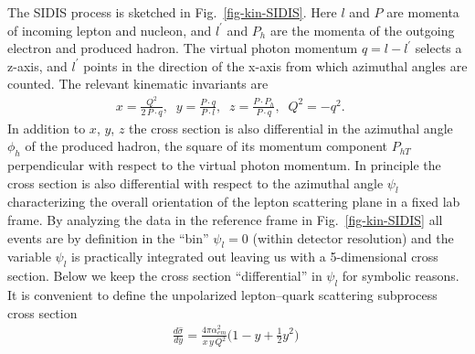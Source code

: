 \documentclass[a4paper,11pt]{article}
\newcommand{\blue}[1]{{\color{blue} #1}}
\newcommand{\ba}{\begin{eqnarray}}
\newcommand{\ea}{\end{eqnarray}}
\newcommand{\ps}[1]{\blue{ #1}}
\def\Phperp{P_{hT}}
\begin{document}
The SIDIS process is sketched in 
Fig.~\ref{fig-kin-SIDIS}. Here $l$ and $P$ are momenta of incoming 
lepton and nucleon, and $l^\prime$ and $P_h$ are the momenta of the outgoing
electron and produced hadron. The virtual photon momentum $q=l-l^\prime$ 
selects a z-axis, and $l^\prime$ points in the direction of the x-axis 
from which azimuthal angles are counted. The relevant kinematic invariants 
are
\ba
   x  = \frac{Q^2}{2\,P\cdot  q}, \;\;
   y = \frac{P \cdot  q}{P \cdot  l}, \;\;
   z = \frac{P \cdot  P_h}{P\cdot  q}, \;\;
   Q^2=-q^2.
\label{eq:xyz}\;\;\;\;\ea
In addition to $x$, $y$, $z$ the cross section is also differential 
in the azimuthal angle $\phi_h$ of the produced hadron, the square 
of its momentum component $\Phperp$ perpendicular with respect to the 
virtual photon momentum. 
In principle the cross section is also differential with respect to the
azimuthal angle $\psi_l$ characterizing the overall orientation of the 
lepton scattering plane in a fixed lab frame.
\ps{By analyzing the data in the reference frame in Fig.~\ref{fig-kin-SIDIS}
all events are by definition in the ``bin'' $\psi_l=0$ (within detector
resolution) and the variable $\psi_l$ is practically integrated out leaving 
us with a 5-dimensional cross section. Below we keep the cross section 
``differential'' in $\psi_l$ for symbolic reasons.} 
It is convenient to define the unpolarized 
lepton--quark scattering subprocess cross section
\ba\label{Eq:sigma0-FUU}
	\frac{d \hat{\sigma}}{dy} 
	= 
	\frac{4 \pi \alpha_{em}^2}{x\,y\,Q^2}
	\biggl(1-y+\frac12y^2\biggr)\;
\ea
\end{document}
